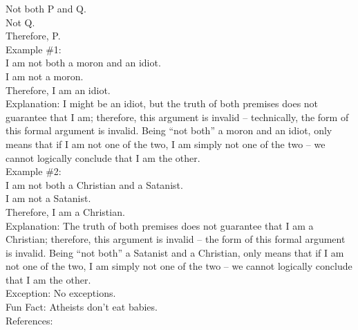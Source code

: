 \documentclass[a4paper,12pt,single,pdftex]{scrartcl}
\begin{document}
    
      Not both P and Q.
    \\

    
      Not Q.
    \\

    
      Therefore, P.
    \\

    
      Example \#1:
    \\

    
      I am not both a moron and an idiot.
    \\

    
      I am not a moron.
    \\

    
      Therefore, I am an idiot.
    \\

    
      Explanation:  I might be an idiot, but the truth of both premises does not guarantee that I am; therefore, this argument is invalid -- technically, the form of this formal argument is invalid.  Being “not both” a moron and an idiot, only means that if I am not one of the two, I am simply not one of the two -- we cannot logically conclude that I am the other.
    \\

    
      Example \#2:
    \\

    
      I am not both a Christian and a Satanist.
    \\

    
      I am not a Satanist.
    \\

    
      Therefore, I am a Christian.
    \\

    
      Explanation:  The truth of both premises does not guarantee that I am a Christian; therefore, this argument is invalid -- the form of this formal argument is invalid.  Being “not both” a Satanist and a Christian, only means that if I am not one of the two, I am simply not one of the two -- we cannot logically conclude that I am the other.
    \\

    
      Exception: No exceptions.
    \\

    
      Fun Fact: Atheists don’t eat babies.
    \\

    References:

    
      
        
      \\
\end{document}
